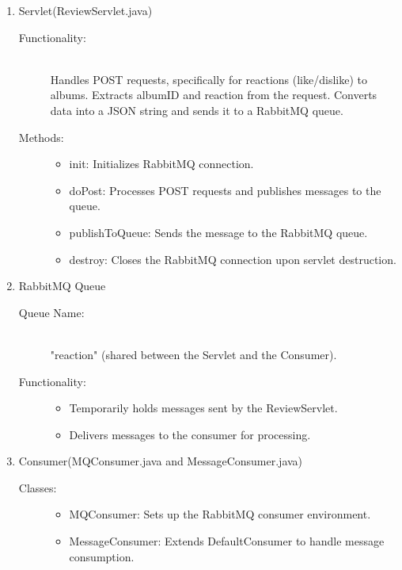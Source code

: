 \documentclass[a4paper,12pt]{article} %
\begin{document}
\begin{enumerate}
\begin{enumerate}
    \item Servlet(ReviewServlet.java)
    \begin{description}
        \item[Functionality:] \hfill \\
        Handles POST requests, specifically for reactions (like/dislike) to albums.
        Extracts albumID and reaction from the request.
        Converts data into a JSON string and sends it to a RabbitMQ queue.
        \item[Methods:] \hfill
        \begin{itemize} 
            \item init: Initializes RabbitMQ connection.
            \item doPost: Processes POST requests and publishes messages to the queue.
            \item publishToQueue: Sends the message to the RabbitMQ queue.
            \item destroy: Closes the RabbitMQ connection upon servlet destruction.
        \end{itemize}
    \end{description}
    \item RabbitMQ Queue
    \begin{description}
        \item[Queue Name:] \hfill \\
        "reaction" (shared between the Servlet and the Consumer).
        \item[Functionality:] \hfill
        \begin{itemize}
            \item Temporarily holds messages sent by the ReviewServlet.
            \item Delivers messages to the consumer for processing.
        \end{itemize}
    \end{description}
    \item Consumer(MQConsumer.java and MessageConsumer.java)
    \begin{description}
        \item[Classes:] \hfill
        \begin{itemize}
            \item MQConsumer: Sets up the RabbitMQ consumer environment.
            \item MessageConsumer: Extends DefaultConsumer to handle message consumption.
        \end{itemize}

\end{description}
\end{enumerate}
\end{enumerate}
\end{document}
